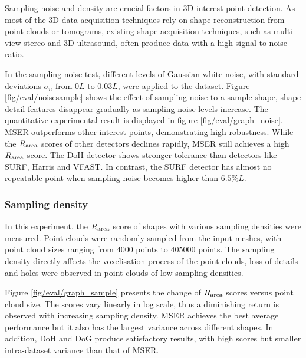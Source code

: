 Sampling noise and density are crucial factors in 3D interest point detection. As most of the 3D data acquisition techniques rely on shape reconstruction from point clouds or tomograms, existing shape acquisition techniques, such as multi-view stereo and 3D ultrasound, often produce data with a high signal-to-noise ratio. 

In the sampling noise test, different levels of Gaussian white noise, with standard deviations $\sigma_{n}$ from $0L$ to $0.03L$, were applied to the \meshset dataset. Figure \ref{fig/eval/noisesample} shows the effect of sampling noise to a sample shape, shape detail features disappear gradually as sampling noise levels increase. 
The quantitative experimental result is displayed in figure \ref{fig/eval/graph_noise}. MSER outperforms other interest points, demonstrating high robustness. While the $R_\textrm{area}$ scores of other detectors declines rapidly, MSER still achieves a high $R_\textrm{area}$ score. The DoH detector shows stronger tolerance than detectors like SURF, Harris and VFAST. In contrast, the SURF detector has almost no repeatable point when sampling noise becomes higher than $6.5\%L$.

\subsubsection{Sampling density}

In this experiment, the $R_\textrm{area}$ score of shapes with various sampling densities were measured. Point clouds were randomly sampled from the input meshes, with point cloud sizes ranging from $4000$ points to $405000$ points. The sampling density directly affects the voxelisation process of the point clouds, loss of details and holes were observed in point clouds of low sampling densities. 

Figure \ref{fig/eval/graph_sample} presents the change of $R_\textrm{area}$ scores versus point cloud size. The scores vary linearly in log scale, thus a diminishing return is observed with increasing sampling density. MSER achieves the best average performance but it also has the largest variance across different shapes. In addition, DoH and DoG produce satisfactory results, with high scores but smaller intra-dataset variance than that of MSER.

